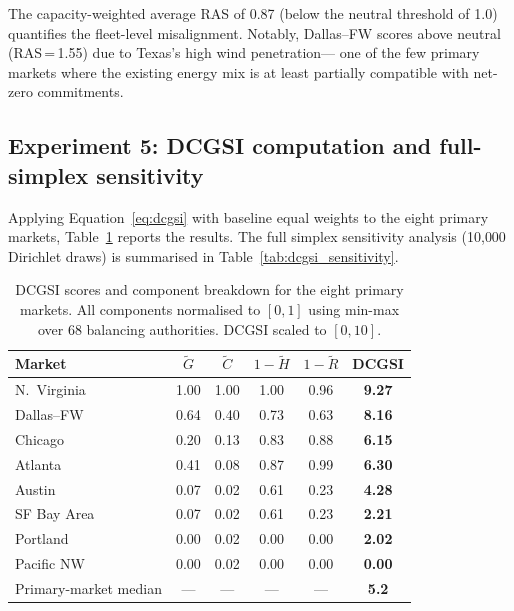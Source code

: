 \documentclass[preprint,12pt]{elsarticle}
\begin{document}
The capacity-weighted average RAS of 0.87 (below the neutral threshold of
1.0) quantifies the fleet-level misalignment. Notably, Dallas--FW scores
above neutral (RAS\,=\,1.55) due to Texas's high wind penetration---
one of the few primary markets where the existing energy mix is at least
partially compatible with net-zero commitments.

\subsection{Experiment 5: DCGSI computation and full-simplex sensitivity}
\label{subsec:exp_dcgsi}

Applying Equation~\ref{eq:dcgsi} with baseline equal weights to the
eight primary markets, Table~\ref{tab:dcgsi} reports the results.
The full simplex sensitivity analysis (10{,}000 Dirichlet draws) is
summarised in Table~\ref{tab:dcgsi_sensitivity}.

\begin{table}[htbp]
\centering
\caption{DCGSI scores and component breakdown for the eight primary
markets. All components normalised to $[0,1]$ using min-max over 68
balancing authorities. DCGSI scaled to $[0,10]$.}
\label{tab:dcgsi}
\small
\begin{tabular}{@{}p{2.8cm}ccccc@{}}
\toprule
\textbf{Market} & $\tilde{G}$ & $\tilde{C}$ & $1{-}\tilde{H}$ &
$1{-}\tilde{R}$ & \textbf{DCGSI} \\
\midrule
N.\ Virginia   & 1.00 & 1.00 & 1.00 & 0.96 & \textbf{9.27} \\
Dallas--FW     & 0.64 & 0.40 & 0.73 & 0.63 & \textbf{8.16} \\
Chicago        & 0.20 & 0.13 & 0.83 & 0.88 & \textbf{6.15} \\
Atlanta        & 0.41 & 0.08 & 0.87 & 0.99 & \textbf{6.30} \\
Austin         & 0.07 & 0.02 & 0.61 & 0.23 & \textbf{4.28} \\
SF Bay Area    & 0.07 & 0.02 & 0.61 & 0.23 & \textbf{2.21} \\
Portland       & 0.00 & 0.02 & 0.00 & 0.00 & \textbf{2.02} \\
Pacific NW     & 0.00 & 0.02 & 0.00 & 0.00 & \textbf{0.00} \\
\midrule
Primary-market median & — & — & — & — & \textbf{5.2} \\
\bottomrule
\end{tabular}
\end{table}
\end{document}

